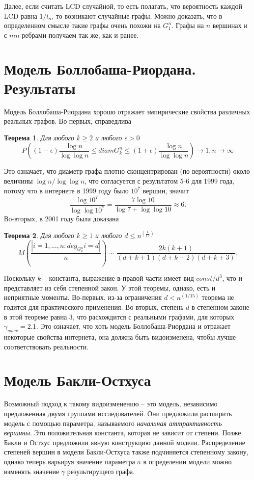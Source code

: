 \documentclass[14pt]{extreport}
\begin{document}
Далее, если считать LCD случайной, то есть полагать, что вероятность каждой LCD равна $1/l_n$, то возникают случайные графы. Можно доказать, что в определенном смысле такие графы очень похожи на $G_1^n$. Графы на $n$ вершинах и с $mn$ ребрами получаем так же, как и ранее.

\section{Модель Боллобаша-Риордана. Результаты}

Модель Боллобаша-Риордана хорошо отражает эмпирические свойства различных реальных графов. Во-первых, справедлива
\newtheorem{theorem}{Теорема}
\begin{theorem}
Для любого $k \ge 2$ и любого $\epsilon > 0$
$$
P\left((1-\epsilon)\frac{\log n}{\log \log n} \le diam G_k^n \le (1+\epsilon)\frac{\log n}{\log \log n}\right) \to 1, n \to \infty
$$
\end{theorem}
Это означает, что диаметр графа плотно сконцентрирован (по вероятности) около величины $\log n / \log \log n$, что согласуется с результатом 5-6 для 1999 года, потому что в интернете в 1999 году было $10^7$ вершин, значит
$$
\frac{\log 10^7}{\log \log 10^7} = \frac {7\log 10}{\log 7 + \log\log 10} \approx 6.
$$
Во-вторых, в 2001 году была доказана
\begin{theorem}
Для любого $k \ge 1$ и любого $d \le n^(\frac{1}{15})$
$$
M\left(\frac{|{i=1,\dots,n:deg_{G_k^n}i = d}|}{n}\right) \sim \frac{2k(k+1)}{(d+k+1)(d+k+2)(d+k+3)}.
$$
\end{theorem}

Поскольку $k$ -- константа, выражение в правой части имеет вид $const / d^3$, что и представляет из себя степенной закон.
У этой теоремы, однако, есть и неприятные моменты. Во-первых, из-за ограничения $d < n^(1/15)$ теорема не годится для практического применения. Во-вторых, степень $d$ в степенном законе в этой теореме равна 3, что расхождится с реальными графами, для которых $\gamma_{www}=2.1$. Это означает, что хоть модель Боллобаша-Риордана и отражает некоторые свойства интернета, она должна быть видоизменена, чтобы лучше соответствовать реальности.

\section{Модель Бакли-Остхуса}

Возможный подход к такому видоизменению -- это модель, независимо предложенная двумя группами исследователей. Они предложили расширить модель с помощью параметра, называемого {\it начальная аттрактивность вершины}. Это положительная константа, которая не зависит от степени. Позже Бакли и Остхус предложили явную конструкцию данной модели. Распределение степеней вершин в модели Бакли-Остхуса также подчиняется степенному закону, однако теперь варьируя значение параметра $a$ в определении модели можно изменять значение $\gamma$ результирущего графа.
\end{document}
